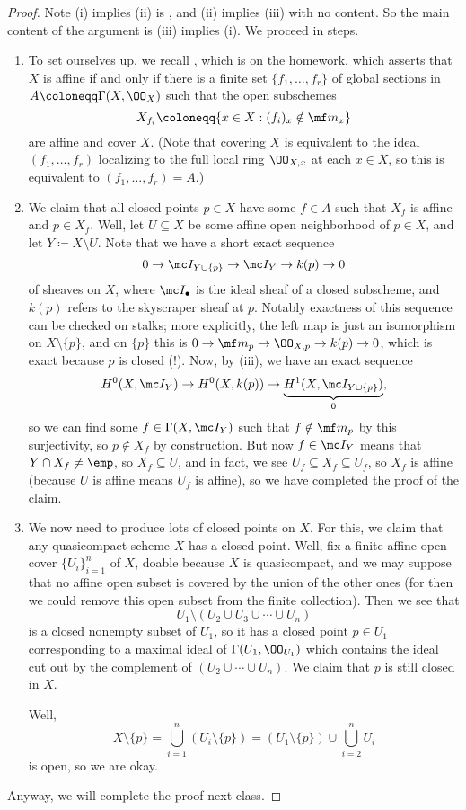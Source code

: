 \documentclass[../notes.tex]{subfiles}
\begin{document}
\begin{proof}
	Note (i) implies (ii) is , and (ii) implies (iii) with no content. So the main content of the argument is (iii) implies (i). We proceed in steps.
	\begin{enumerate}
		\item To set ourselves up, we recall \cite[Exercise~II.2.17]{hartshorne}, which is on the homework, which asserts that $X$ is affine if and only if there is a finite set $\{f_1,\ldots,f_r\}$ of global sections in $A\coloneqq\Gamma(X,\OO_X)$ such that the open subschemes
		\[X_{f_i}\coloneqq\{x\in X:(f_i)_x\notin\mf m_x\}\]
		are affine and cover $X$. (Note that covering $X$ is equivalent to the ideal $(f_1,\ldots,f_r)$ localizing to the full local ring $\OO_{X,x}$ at each $x\in X$, so this is equivalent to $(f_1,\ldots,f_r)=A$.)

		\item We claim that all closed points $p\in X$ have some $f\in A$ such that $X_f$ is affine and $p\in X_f$. Well, let $U\subseteq X$ be some affine open neighborhood of $p\in X$, and let $Y\coloneqq X\setminus U$. Note that we have a short exact sequence
		\[0\to\mc I_{Y\cup\{p\}}\to\mc I_Y\to k(p)\to0\]
		of sheaves on $X$, where $\mc I_\bullet$ is the ideal sheaf of a closed subscheme, and $k(p)$ refers to the skyscraper sheaf at $p$. Notably exactness of this sequence can be checked on stalks; more explicitly, the left map is just an isomorphism on $X\setminus\{p\}$, and on $\{p\}$ this is $0\to\mf m_p\to\OO_{X,p}\to k(p)\to0$, which is exact because $p$ is closed (!). Now, by (iii), we have an exact sequence
		\[H^0(X,\mc I_Y)\to H^0(X, k(p))\to\underbrace{H^1(X,\mc I_{Y\cup\{p\}})}_0,\]
		so we can find some $f\in\Gamma(X,\mc I_Y)$ such that $f\notin\mf m_p$ by this surjectivity, so $p\notin X_f$ by construction. But now $f\in\mc I_Y$ means that $Y\cap X_f\ne\emp$, so $X_f\subseteq U$, and in fact, we see $U_f\subseteq X_f\subseteq U_f$, so $X_f$ is affine (because $U$ is affine means $U_f$ is affine), so we have completed the proof of the claim.

		\item We now need to produce lots of closed points on $X$. For this, we claim that any quasicompact scheme $X$ has a closed point. Well, fix a finite affine open cover $\{U_i\}_{i=1}^n$ of $X$, doable because $X$ is quasicompact, and we may suppose that no affine open subset is covered by the union of the other ones (for then we could remove this open subset from the finite collection). Then we see that
		\[U_1\setminus(U_2\cup U_3\cup\cdots\cup U_n)\]
		is a closed nonempty subset of $U_1$, so it has a closed point $p\in U_1$ corresponding to a maximal ideal of $\Gamma(U_1,\OO_{U_1})$ which contains the ideal cut out by the complement of $(U_2\cup\cdots\cup U_n)$. We claim that $p$ is still closed in $X$.
		
		Well,
		\[X\setminus\{p\}=\bigcup_{i=1}^n(U_i\setminus\{p\})=(U_1\setminus\{p\})\cup\bigcup_{i=2}^nU_i\]
		is open, so we are okay.
	\end{enumerate}
	Anyway, we will complete the proof next class.
\end{proof}
\end{document}
